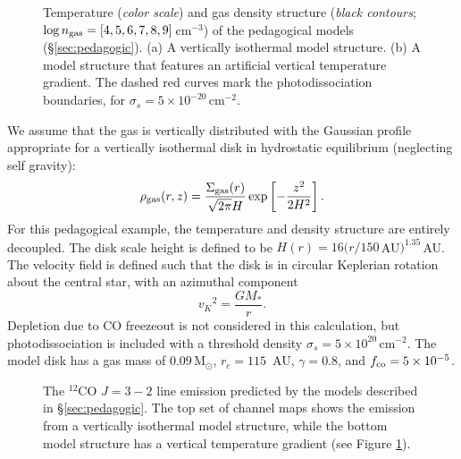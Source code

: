 \begin{figure}[t!]
\caption{Temperature ({\it color scale}) and gas density structure 
({\it black contours}; $\log n_{\rm gas} = [4,5,6,7,8,9]$\,cm$^{-3}$) of the 
pedagogical models (\S\ref{sec:pedagogic}).  (a) A vertically isothermal model 
structure. (b) A model structure that features an artificial vertical 
temperature gradient.  The dashed red curves mark the photodissociation 
boundaries, for $\sigma_s = 5\times 10^{-20}$\,cm$^{-2}$.
\label{fig:pedagogical_struct}}
\end{figure}

We assume that the gas is vertically distributed with the Gaussian profile 
appropriate for a vertically isothermal disk in hydrostatic equilibrium 
(neglecting self gravity):
\begin{equation}
\rho_{\rm gas}(r,z) = \frac{\Sigma_{\rm gas}(r)}{\sqrt{2\pi}H} \exp \left[-\frac{z^2}{2H^2}\right].
\end{equation}
For this pedagogical example, the temperature and density structure are 
entirely decoupled. The disk scale height is defined to be 
$H(r) = 16(r/150$\,AU$)^{1.35}$\,AU.  The velocity field is defined such that 
the disk is in circular Keplerian rotation about the central star, with an azimuthal
component
\begin{equation}
{v_K}^2 = \frac{G M_\ast}{r}.
\end{equation}
Depletion due to CO freezeout is not considered in this calculation, but 
photodissociation is included with a threshold density 
$\sigma_s=5\times10^{20}$\,cm$^{-2}$.  The model disk has a gas mass of 
$0.09$\,M$_\odot$, $r_c = 115$\, AU, $\gamma = 0.8$, and 
$f_{\rm co} = 5\times10^{-5}$.

\begin{figure}[t!]
\caption{The $^{12}$CO $J=3-2$ line emission predicted by the models 
described in \S \ref{sec:pedagogic}.  The top set of channel maps shows the 
emission from a vertically isothermal model structure, while the bottom model 
structure has a vertical temperature gradient (see Figure 
\ref{fig:pedagogical_struct}). 
\label{fig:pedagogical}}
\end{figure}

